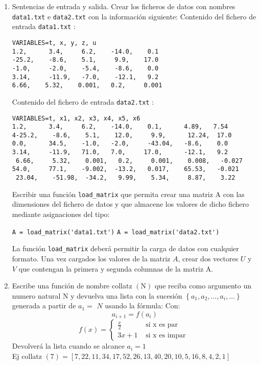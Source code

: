 \documentclass[12pt]{article}
\begin{document}
\begin{enumerate}
\item  Sentencias de entrada y salida.
\vspace{0.5cm}    
Crear los ficheros de datos con nombres  \verb|data1.txt| e 
\verb|data2.txt| con la información siguiente:
\vspace{1cm}
Contenido del fichero de entrada \verb|data1.txt| :
\begin{verbatim}
VARIABLES=t, x, y, z, u
1.2,      3.4,     6.2,    -14.0,    0.1
-25.2,    -8.6,    5.1,     9.9,    17.0
-1.0,     -2.0,    -5.4,    -8.6,    0.0
3.14,     -11.9,   -7.0,    -12.1,   9.2
6.66,    5.32,    0.001,   0.2,     0.001
\end{verbatim}
\vspace{0.1cm}
Contenido del fichero de entrada \verb|data2.txt| :
\begin{verbatim}
VARIABLES=t, x1, x2, x3, x4, x5, x6
1.2,      3.4,     6.2,    -14.0,    0.1,      4.89,   7.54
4-25.2,    -8.6,    5.1,    12.0,     9.9,      12.24,  17.0
0.0,      34.5,    -1.0,   -2.0,     -43.04,   -8.6,    0.0
3.14,     -11.9,   71.0,   7.0,     17.0,      -12.1,   9.2
 6.66,     5.32,    0.001,   0.2,     0.001,    0.008,   -0.027
54.0,     77.1,    -9.002,  -13.2,   0.017,    65.53,   -0.021
 23.04,    -51.98,  -34.2,   9.99,    5.34,     8.87,    3.22 
\end{verbatim}
\vspace{0.5cm}
Escribir una función \verb|load_matrix| que permita crear una matriz A con las dimensiones 
del fichero de datos y que almacene los valores de dicho fichero mediante 
 asignaciones del tipo: 

 \hspace{1cm} \verb|A = load_matrix('data1.txt')| 
 \hspace{1cm}  \verb|A = load_matrix('data2.txt')|

La función   \verb|load_matrix| deberá permitir la carga de datos con cualquier formato. 
Una vez cargados los valores de la matriz $ A $, crear dos vectores $ U$ y $V$  que contengan la primera y segunda columnas de la matriz A. 
     




	
\item Escribe una función de nombre collatz $(\mathrm{N})$ 
que reciba como argumento un numero natural $\mathrm{N}$ y 
devuelva una lista con la sucesión $\left\{a_{1}, a_{2}, \ldots, a_{i}, \ldots\right\}$ 
generada a partir de $a_{1}=$ $N$ usando la fórmula:
	Con:
	$$
	a_{i+1}=f\left(a_{i}\right)
	$$
	$$
	f(x)=\left\{\begin{array}{cl}
		\frac{x}{2} & \text { si x es par } \\
		3 x+1 & \text { si x es impar }
	\end{array}\right.
	$$
	Devolverá la lista cuando se alcance $a_{i}=1$ \\
	Ej collatz $(7)=[7,22,11,34,17,52,26,13,40,20,10,5,16,8,4,2,1]$
	
\end{enumerate} 
\end{document}
